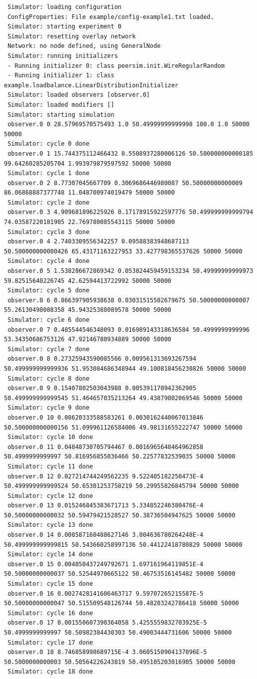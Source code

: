 \documentclass[a4paper,12pt]{article}
\begin{document}
\tiny
\begin{verbatim}
 Simulator: loading configuration
 ConfigProperties: File example/config-example1.txt loaded.
 Simulator: starting experiment 0
 Simulator: resetting overlay network
 Network: no node defined, using GeneralNode
 Simulator: running initializers
 - Running initializer 0: class peersim.init.WireRegularRandom
 - Running initializer 1: class example.loadbalance.LinearDistributionInitializer
 Simulator: loaded observers [observer.0]
 Simulator: loaded modifiers []
 Simulator: starting simulation
 observer.0 0 28.57969570575493 1.0 50.49999999999998 100.0 1.0 50000 50000
 Simulator: cycle 0 done
 observer.0 1 15.744375112466432 0.5508937280006126 50.500000000000185 99.64260285205704 1.993979879597592 50000 50000
 Simulator: cycle 1 done
 observer.0 2 8.77307045667709 0.3069686446980087 50.50000000000009 86.06868887377748 11.048700974019479 50000 50000
 Simulator: cycle 2 done
 observer.0 3 4.909681896225926 0.17178915922597776 50.499999999999794 74.03587220181905 22.769780085543115 50000 50000
 Simulator: cycle 3 done
 observer.0 4 2.7403309556342257 0.09588383948687113 50.500000000000426 65.43171163227953 33.427798365537626 50000 50000
 Simulator: cycle 4 done
 observer.0 5 1.538286672869342 0.053824459459153234 50.49999999999973 59.82515640226745 42.62594413722992 50000 50000
 Simulator: cycle 5 done
 observer.0 6 0.866397905938638 0.03031515502679675 50.50000000000007 55.26130498088358 45.94325388089578 50000 50000
 Simulator: cycle 6 done
 observer.0 7 0.485544546348093 0.016989143318636584 50.4999999999996 53.34350686753126 47.92146780934889 50000 50000
 Simulator: cycle 7 done
 observer.0 8 0.27325943590085566 0.009561313693267594 50.499999999999936 51.953084686348944 49.100818456230826 50000 50000
 Simulator: cycle 8 done
 observer.0 9 0.15407802503043988 0.005391170942362905 50.499999999999545 51.464657035213264 49.43879802069546 50000 50000
 Simulator: cycle 9 done
 observer.0 10 0.08620333588583261 0.0030162440067013846 50.500000000000156 51.099961126584006 49.98131655222747 50000 50000
 Simulator: cycle 10 done
 observer.0 11 0.04848730705794467 0.0016965648464962858 50.4999999999997 50.816956855036466 50.22577832539035 50000 50000
 Simulator: cycle 11 done
 observer.0 12 0.027214744249562235 9.522405182250473E-4 50.499999999999524 50.65301253758219 50.29955826845794 50000 50000
 Simulator: cycle 12 done
 observer.0 13 0.015246845383671713 5.334852246380476E-4 50.50000000000032 50.59479421528527 50.38736504947625 50000 50000
 Simulator: cycle 13 done
 observer.0 14 0.008587160488627146 3.004636780264248E-4 50.499999999999815 50.543660258997136 50.44122418780829 50000 50000
 Simulator: cycle 14 done
 observer.0 15 0.004850437249792671 1.697161964119851E-4 50.50000000000037 50.52544970665122 50.46753516145482 50000 50000
 Simulator: cycle 15 done
 observer.0 16 0.0027428141606463717 9.59707265215587E-5 50.50000000000047 50.515509548126744 50.48203242786418 50000 50000
 Simulator: cycle 16 done
 observer.0 17 0.001550607390364058 5.4255559832703925E-5 50.4999999999997 50.50982384430303 50.49003444731606 50000 50000
 Simulator: cycle 17 done
 observer.0 18 8.746858998689715E-4 3.0605150904137896E-5 50.5000000000003 50.50564226243819 50.495105203016905 50000 50000
 Simulator: cycle 18 done
\end{verbatim}
\end{document}
